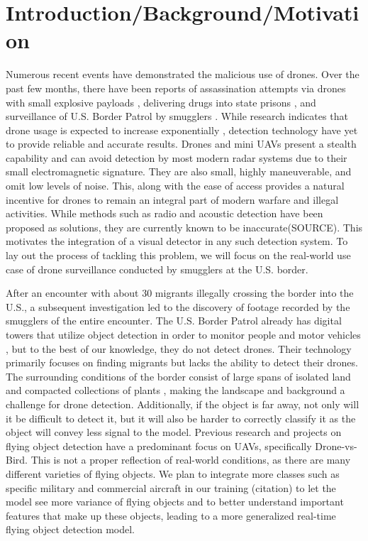 \documentclass[10pt,twocolumn,letterpaper]{article}
\begin{document}
\section{Introduction/Background/Motivation}
Numerous recent events have demonstrated the malicious use of drones. Over the past few months, there have been reports of assassination attempts via drones with small explosive payloads \cite{SuicideDrone}, delivering drugs into state prisons \cite{PrisonDrugs}, and surveillance of U.S. Border Patrol by smugglers \cite{BorderPatrol}. While research indicates that drone usage is expected to increase exponentially \cite{DroneMarket}, detection technology have yet to provide reliable and accurate results. Drones and mini UAVs present a stealth capability and can avoid detection by most modern radar systems due to their small electromagnetic signature. They are also small, highly maneuverable, and omit low levels of noise. This, along with the ease of access provides a natural incentive for drones to remain an integral part of modern warfare and illegal activities. While methods such as radio and acoustic detection have been proposed as solutions, they are currently known to be inaccurate(SOURCE). This motivates the integration of a visual detector in any such detection system. To lay out the process of tackling this problem, we will focus on the real-world use case of drone surveillance conducted by smugglers at the U.S. border.

After an encounter with about 30 migrants illegally crossing the border into the U.S., a subsequent investigation led to the discovery of footage recorded by the smugglers of the entire encounter. The U.S. Border Patrol already has digital towers that utilize object detection in order to monitor people and motor vehicles \cite{BorderDetection}, but to the best of our knowledge, they do not detect drones. Their technology primarily focuses on finding migrants but lacks the ability to detect their drones. The surrounding conditions of the border consist of large spans of isolated land and compacted collections of plants \cite{BorderDigitalTowers}, making the landscape and background a challenge for drone detection. Additionally, if the object is far away, not only will it be difficult to detect it, but it will also be harder to correctly classify it as the object will convey less signal to the model. Previous research and projects on flying object detection have a predominant focus on UAVs, specifically Drone-vs-Bird. This is not a proper reflection of real-world conditions, as there are many different varieties of flying objects. We plan to integrate more classes such as specific military and commercial aircraft in our training (citation) to let the model see more variance of flying objects and to better understand important features that make up these objects, leading to a more generalized real-time flying object detection model. 
\end{document}
